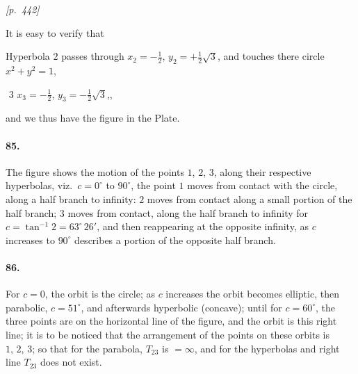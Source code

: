 \documentclass[11pt]{article}
\begin{document}
\medskip
\noindent\textit{[p.~442]}

\medskip

It is easy to verify that

Hyperbola $2$ passes through $x_{2} = -\tfrac{1}{2}$, $y_{2} = +\tfrac{1}{2}\sqrt{3}$, and touches there circle $x^{2} + y^{2} = 1$,

\quad\,\,$3$\quad\quad\quad\,\,$x_{3} = -\tfrac{1}{2}$, $y_{3} = -\tfrac{1}{2}\sqrt{3}$\quad\quad\quad\quad\quad\quad\quad\quad ,,

and we thus have the figure in the Plate.

\paragraph{85.} The figure shows the motion of the points $1$, $2$, $3$, along their respective hyperbolas, viz.\ $c = 0^{\circ}$ to $90^{\circ}$, the point $1$ moves from contact with the circle, along a half branch to infinity: $2$ moves from contact along a small portion of the half branch; $3$ moves from contact, along the half branch to infinity for $c = \tan^{-1}2 = 63^{\circ}\,26'$, and then reappearing at the opposite infinity, as $c$ increases to $90^{\circ}$ describes a portion of the opposite half branch.

\paragraph{86.} For $c = 0$, the orbit is the circle; as $c$ increases the orbit becomes elliptic, then parabolic, $c = 51^{\circ}$, and afterwards hyperbolic (concave); until for $c = 60^{\circ}$, the three points are on the horizontal line of the figure, and the orbit is this right line; it is to be noticed that the arrangement of the points on these orbits is $1,\, 2,\, 3$; so that for the parabola, $T_{23}$ is $= \infty$, and for the hyperbolas and right line $T_{23}$ does not exist.
\end{document}
